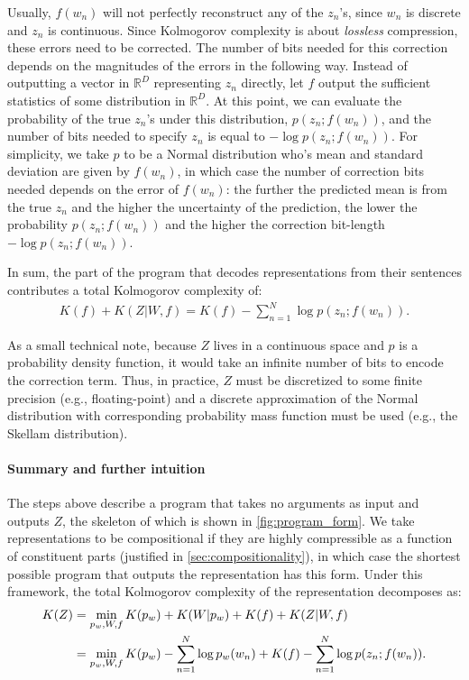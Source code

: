 \documentclass{article}
\begin{document}
Usually, $f(w_n)$ will not perfectly reconstruct any of the $z_n$'s, since $w_n$ is discrete and $z_n$ is continuous. Since Kolmogorov complexity is about \emph{lossless} compression, these errors need to be corrected. The number of bits needed for this correction depends on the magnitudes of the errors in the following way. Instead of outputting a vector in $\mathbb{R}^D$ representing $z_n$ directly, let $f$ output the sufficient statistics of some distribution in $\mathbb{R}^D$. At this point, we can evaluate the probability of the true $z_n$'s under this distribution, $p(z_n;f(w_n))$, and the number of bits needed to specify $z_n$ is equal to $-\log p(z_n;f(w_n))$. For simplicity, we take $p$ to be a Normal distribution who's mean and standard deviation are given by $f(w_n)$, in which case the number of correction bits needed depends on the error of $f(w_n)$: the further the predicted mean is from the true $z_n$ and the higher the uncertainty of the prediction, the lower the probability $p(z_n;f(w_n))$ and the higher the correction bit-length $-\log p(z_n;f(w_n))$.

In sum, the part of the program that decodes representations from their sentences contributes a total Kolmogorov complexity of:
\begin{align*}
     K(f) + K(Z|W,f) = K(f) - \sum_{n=1}^N \log p(z_n;f(w_n)) .
\end{align*}

As a small technical note, because $Z$ lives in a continuous space and $p$ is a probability density function, it would take an infinite number of bits to encode the correction term. Thus, in practice, $Z$ must be discretized to some finite precision (e.g., floating-point) and a discrete approximation of the Normal distribution with corresponding probability mass function must be used (e.g., the Skellam distribution).

\paragraph{Summary and further intuition}

The steps above describe a program that takes no arguments as input and outputs $Z$, the skeleton of which is shown in \cref{fig:program_form}. We take representations to be compositional if they are highly compressible as a function of constituent parts (justified in \cref{sec:compositionality}), in which case the shortest possible program that outputs the representation has this form. Under this framework, the total Kolmogorov complexity of the representation decomposes as:
\begin{align}
    \label{eq:K(Z)}
    K(Z) &= \min_{p_w,W,f} K(p_w) + K(W|p_w) + K(f) + K(Z|W,f) \\
         &= \min_{p_w,W,f} K(p_w) - \sum_{n=1}^N \log p_w(w_n) + K(f) - \sum_{n=1}^N \log p(z_n;f(w_n)) . \notag
\end{align}
\end{document}
